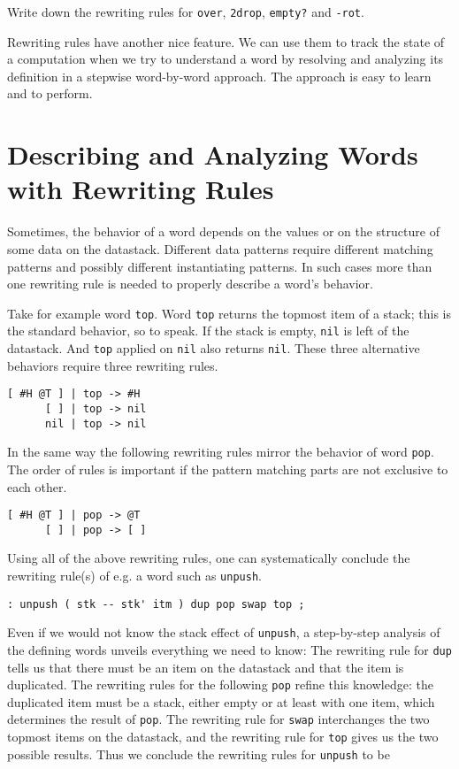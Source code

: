 \begin{exercise}\label{ex:over.etc}
Write down the rewriting rules for \verb|over|, \verb|2drop|, \verb|empty?| and \verb|-rot|.
\end{exercise}

Rewriting rules have another nice feature. We can use them to track the state of a computation when we try to understand a word by resolving and analyzing its definition in a stepwise word-by-word approach. The approach is easy to learn and to perform.

\section{Describing and Analyzing Words with Rewriting Rules}

Sometimes, the behavior of a word depends on the values or on the structure of some data on the datastack. Different data patterns require different matching patterns and possibly different instantiating patterns. In such cases more than one rewriting rule is needed to properly describe a word's behavior.

Take for example word \verb|top|. Word \verb|top| returns the topmost item of a stack; this is the standard behavior, so to speak. If the stack is empty, \verb|nil| is left of the datastack. And \verb|top| applied on \verb|nil| also returns \verb|nil|. These three alternative behaviors require three rewriting rules.

\begin{verbatim}
[ #H @T ] | top -> #H
      [ ] | top -> nil
      nil | top -> nil
\end{verbatim}

In the same way the following rewriting rules mirror the behavior of word \verb|pop|. The order of rules is important if the pattern matching parts are not exclusive to each other.

\begin{verbatim}
[ #H @T ] | pop -> @T
      [ ] | pop -> [ ]
\end{verbatim}

Using all of the above rewriting rules, one can systematically conclude the rewriting rule(s) of e.g. a word such as \verb|unpush|.

\begin{verbatim}
: unpush ( stk -- stk' itm ) dup pop swap top ;
\end{verbatim}

Even if we would not know the stack effect of \verb|unpush|, a step-by-step analysis of the defining words unveils everything we need to know: The rewriting rule for \verb|dup| tells us that there must be an item on the datastack and that the item is duplicated. The rewriting rules for the following \verb|pop| refine this knowledge: the duplicated item must be a stack, either empty or at least with one item, which determines the result of \verb|pop|. The rewriting rule for \verb|swap| interchanges the two topmost items on the datastack, and the rewriting rule for \verb|top| gives us the two possible results. Thus we conclude the rewriting rules for \verb|unpush| to be  

